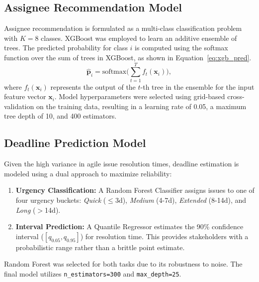 \documentclass[conference]{IEEEtran}
\begin{document}
\subsection{Assignee Recommendation Model}

Assignee recommendation is formulated as a multi-class classification problem with $K=8$ classes. XGBoost was employed to learn an additive ensemble of trees. The predicted probability for class $i$ is computed using the softmax function over the sum of trees in XGBoost, as shown in Equation~\ref{eq:xgb_pred}.
\begin{equation}
\hat{\mathbf{p}}_i = \mathrm{softmax}\Big(\sum_{t=1}^{T} f_t(\mathbf{x}_i)\Big),
\label{eq:xgb_pred}
\end{equation}
where $f_t(\mathbf{x}_i)$ represents the output of the $t$-th tree in the ensemble for the input feature vector $\mathbf{x}_i$.
Model hyperparameters were selected using grid-based cross-validation on the training data, resulting in a learning rate of 0.05, a maximum tree depth of 10, and 400 estimators.

\subsection{Deadline Prediction Model}

Given the high variance in agile issue resolution times, deadline estimation is modeled using a dual approach to maximize reliability:
\begin{enumerate}
    \item \textbf{Urgency Classification:} A Random Forest Classifier assigns issues to one of four urgency buckets: \textit{Quick} ($\le$3d), \textit{Medium} (4-7d), \textit{Extended} (8-14d), and \textit{Long} ($>$14d).
    \item \textbf{Interval Prediction:} A Quantile Regressor estimates the 90\% confidence interval ($[q_{0.05}, q_{0.95}]$) for resolution time. This provides stakeholders with a probabilistic range rather than a brittle point estimate.
\end{enumerate}

Random Forest was selected for both tasks due to its robustness to noise. The final model utilizes \texttt{n\_estimators=300} and \texttt{max\_depth=25}.
\end{document}
